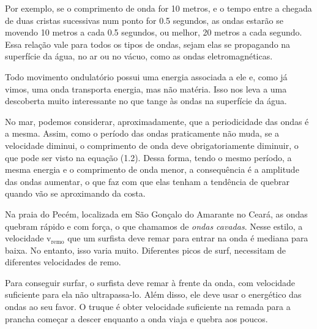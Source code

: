 \documentclass[book, 12pt, twoside, a5paper, english, brazil, sumario=tradicional, openany]{abntex2}
\begin{document}
\vspace{0.1cm}

Por exemplo, se o comprimento de onda for 10 metros, e o tempo entre a chegada de duas cristas sucessivas num ponto for 0.5 segundos, as ondas estarão se movendo 10 metros a cada 0.5 segundos, ou melhor, 20 metros a cada segundo. Essa relação vale para todos os tipos de ondas, sejam elas se propagando na superfície da água, no ar ou no vácuo, como as ondas eletromagnéticas.

\vspace{-0.8cm}

{}

\vspace{-0.3cm}

Todo movimento ondulatório possui uma energia associada a ele e, como já vimos, uma onda transporta energia, mas não matéria. Isso nos leva a uma descoberta muito interessante no que tange às ondas na superfície da água.

No mar, podemos considerar, aproximadamente, que a periodicidade das ondas é a mesma. Assim, como o período das ondas praticamente não muda, se a velocidade diminui, o comprimento de onda deve obrigatoriamente diminuir, o que pode ser visto na equação (1.2). Dessa forma, tendo o mesmo período, a mesma energia e o comprimento de onda menor, a consequência é a amplitude das ondas aumentar, o que faz com que elas tenham a tendência de quebrar quando vão se aproximando da costa.

{}

\vspace{-0.3cm}

Na praia do Pecém, localizada em São Gonçalo do Amarante no Ceará, as ondas quebram rápido e com força, o que chamamos de \textit{ondas cavadas}. Nesse estilo, a velocidade $\text{v}_{\text{remo}}$ que um surfista deve remar para entrar na onda é mediana para baixa. No entanto, isso varia muito. Diferentes picos de surf, necessitam de diferentes velocidades de remo. 

Para conseguir surfar, o surfista deve remar à frente da onda, com velocidade suficiente para ela não ultrapassa-lo. Além disso, ele deve usar o {\color{celestialblue}{pontencial gravitacional}} energético das ondas ao seu favor. O truque é obter velocidade suficiente na remada para a prancha começar a descer enquanto a onda viaja e quebra aos poucos.
\end{document}
